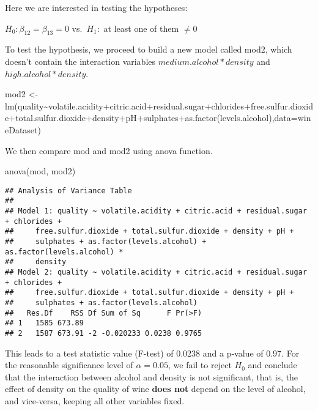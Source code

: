 \documentclass[
]{article}
\newenvironment{Shaded}{\begin{snugshade}}{\end{snugshade}}
\newcommand{\AttributeTok}[1]{\textcolor[rgb]{0.77,0.63,0.00}{#1}}
\newcommand{\FunctionTok}[1]{\textcolor[rgb]{0.00,0.00,0.00}{#1}}
\newcommand{\NormalTok}[1]{#1}
\newcommand{\OtherTok}[1]{\textcolor[rgb]{0.56,0.35,0.01}{#1}}
\newcommand{\SpecialCharTok}[1]{\textcolor[rgb]{0.00,0.00,0.00}{#1}}
\begin{document}
Here we are interested in testing the hypotheses:

\(H_0: \beta_{12} = \beta_{13} =0\) vs.~\(H_1:\) at least one of them
\(\neq 0\)

To test the hypothesis, we proceed to build a new model called mod2,
which doesn't contain the interaction variables
\(medium.alcohol*density\) and \(high.alcohol*density\).

\begin{Shaded}
\begin{Highlighting}[]
\NormalTok{mod2 }\OtherTok{\textless{}{-}} \FunctionTok{lm}\NormalTok{(quality}\SpecialCharTok{\textasciitilde{}}\NormalTok{volatile.acidity}\SpecialCharTok{+}\NormalTok{citric.acid}\SpecialCharTok{+}\NormalTok{residual.sugar}\SpecialCharTok{+}\NormalTok{chlorides}\SpecialCharTok{+}\NormalTok{free.sulfur.dioxide}\SpecialCharTok{+}\NormalTok{total.sulfur.dioxide}\SpecialCharTok{+}\NormalTok{density}\SpecialCharTok{+}\NormalTok{pH}\SpecialCharTok{+}\NormalTok{sulphates}\SpecialCharTok{+}\FunctionTok{as.factor}\NormalTok{(levels.alcohol),}\AttributeTok{data=}\NormalTok{wineDataset)}
\end{Highlighting}
\end{Shaded}

We then compare mod and mod2 using anova function.

\begin{Shaded}
\begin{Highlighting}[]
\FunctionTok{anova}\NormalTok{(mod, mod2)}
\end{Highlighting}
\end{Shaded}

\begin{verbatim}
## Analysis of Variance Table
## 
## Model 1: quality ~ volatile.acidity + citric.acid + residual.sugar + chlorides + 
##     free.sulfur.dioxide + total.sulfur.dioxide + density + pH + 
##     sulphates + as.factor(levels.alcohol) + as.factor(levels.alcohol) * 
##     density
## Model 2: quality ~ volatile.acidity + citric.acid + residual.sugar + chlorides + 
##     free.sulfur.dioxide + total.sulfur.dioxide + density + pH + 
##     sulphates + as.factor(levels.alcohol)
##   Res.Df    RSS Df Sum of Sq      F Pr(>F)
## 1   1585 673.89                           
## 2   1587 673.91 -2 -0.020233 0.0238 0.9765
\end{verbatim}

This leads to a test statistic value (F-test) of 0.0238 and a p-value of
0.97. For the reasonable significance level of \(\alpha=0.05\), we fail
to reject \(H_0\) and conclude that the interaction between alcohol and
density is not significant, that is, the effect of density on the
quality of wine \textbf{does not} depend on the level of alcohol, and
vice-versa, keeping all other variables fixed.
\end{document}
